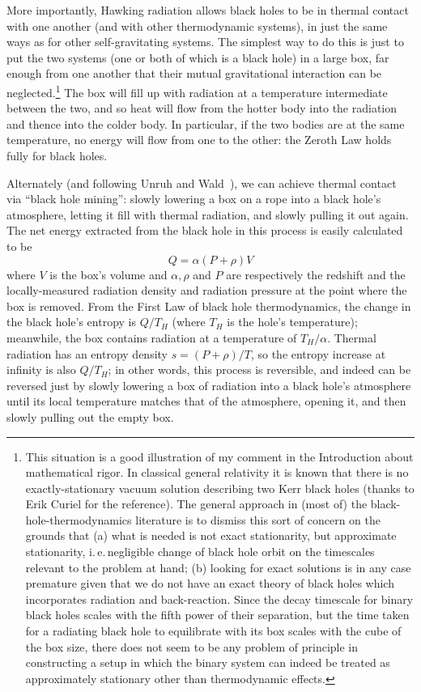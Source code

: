 \documentclass[12pt]{article}
\newcommand{\iec}{\mbox{i.\,e.\,}}
\newcommand{\be}{\begin{equation}}
\newcommand{\ee}{\end{equation}}
\begin{document}
More importantly, Hawking radiation allows black holes to be in thermal contact with one another (and with other thermodynamic systems), in just the same ways as for other self-gravitating systems. The simplest way to do this is just to put the two systems (one or both of which is a black hole) in a large box, far enough from one another that their mutual gravitational interaction can be neglected.\footnote{This situation is a good illustration of my comment in the Introduction about mathematical rigor. In classical general relativity it is known \cite{mankoruiz} that there is no exactly-stationary vacuum solution describing two Kerr black holes (thanks to Erik Curiel for the reference). The general approach in (most of) the black-hole-thermodynamics literature is to dismiss this sort of concern on the grounds that (a) what is needed is not exact stationarity, but approximate stationarity, \iec negligible change of black hole orbit on the timescales relevant   to the problem at hand; (b) looking for exact solutions is in any case premature given that we do not have an exact theory of black holes which incorporates radiation and back-reaction. Since the decay timescale for binary black holes scales with the fifth power of their separation, but the time taken for a radiating black hole to equilibrate with its box scales with the cube of the box size, there does not seem to be any problem of principle in constructing a setup in which the binary system can indeed be treated as approximately stationary other than thermodynamic effects.} The box will fill up with radiation at a temperature intermediate between the two, and so heat will flow from the hotter body into the radiation and thence into the colder body. In particular, if the two bodies are at the same temperature, no energy will flow from one to the other: the Zeroth Law holds fully for black holes.

Alternately (and following Unruh and Wald~\citeyear{unruhwald1982,unruhwald1983}), we can achieve thermal contact via ``black hole mining'': slowly lowering a box on a rope into a black hole's atmosphere, letting it fill with thermal radiation, and slowly pulling it out again. The net energy extracted from the black hole in this process is easily calculated to be
\be
Q = \alpha (P + \rho) V
\ee
where $V$ is the box's volume and $\alpha, \rho$ and $P$ are respectively the redshift and the locally-measured radiation density and radiation pressure at the point where the box is removed. From the First Law of black hole thermodynamics, the change in the black hole's entropy is $Q/T_H$ (where $T_H$ is the hole's temperature); meanwhile, the box contains radiation at a temperature of $T_H/\alpha$. Thermal radiation has an entropy density $s=(P+\rho)/T$, so the entropy increase at infinity is also $Q/T_H$; in other words, this process is reversible, and indeed can be reversed just by slowly lowering a box of radiation into a black hole's atmosphere until its local temperature matches that of the atmosphere, opening it, and then slowly pulling out the empty box.
\end{document}
